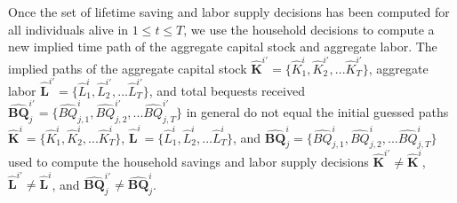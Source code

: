   Once the set of lifetime saving and labor supply decisions has been computed for all individuals alive in $1\leq t\leq T$, we use the household decisions to compute a new implied time path of the aggregate capital stock and aggregate labor. The implied paths of the aggregate capital stock $\bm{\hat{K}}^{i'}=\{\hat{K}_1^i,\hat{K}_2^{i'},...\hat{K}_T^{i'}\}$, aggregate labor $\bm{\hat{L}}^{i'}=\{\hat{L}_1^i,\hat{L}_2^{i'},...\hat{L}_T^{i'}\}$, and total bequests received $\bm{\hat{BQ}}_j^{i'}=\{\hat{BQ}_{j,1}^i,\hat{BQ}_{j,2}^{i'},...\hat{BQ}_{j,T}^{i'}\}$ in general do not equal the initial guessed paths $\bm{\hat{K}}^{i}=\{\hat{K}_1^i,\hat{K}_2^{i},...\hat{K}_T^{i}\}$, $\bm{\hat{L}}^{i}=\{\hat{L}_1^i,\hat{L}_2^{i},...\hat{L}_T^{i}\}$, and $\bm{\hat{BQ}}_j^{i}=\{\hat{BQ}_{j,1}^i,\hat{BQ}_{j,2}^{i},...\hat{BQ}_{j,T}^{i}\}$ used to compute the household savings and labor supply decisions $\bm{\hat{K}}^{i'}\neq\bm{\hat{K}}^i$, $\bm{\hat{L}}^{i'}\neq\bm{\hat{L}}^i$, and $\bm{\hat{BQ}}_j^{i'}\neq\bm{\hat{BQ}}_j^i$.

